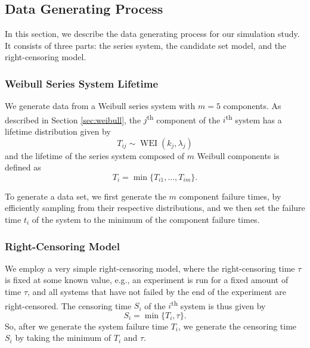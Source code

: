 \documentclass[
]{article}
\begin{document}
\hypertarget{data-generating-process}{%
\subsection{Data Generating Process}\label{data-generating-process}}

In this section, we describe the data generating process for our
simulation study. It consists of three parts: the series system, the
candidate set model, and the right-censoring model.

\hypertarget{weibull-series-system-lifetime}{%
\subsubsection*{Weibull Series System
Lifetime}\label{weibull-series-system-lifetime}}

We generate data from a Weibull series system with \(m=5\) components.
As described in Section \ref{sec:weibull}, the \(j\)\textsuperscript{th}
component of the \(i\)\textsuperscript{th} system has a lifetime
distribution given by \[
    T_{i j} \sim \operatorname{WEI}(k_j, \lambda_j)
\] and the lifetime of the series system composed of \(m\) Weibull
components is defined as \[
    T_i = \min\{T_{i 1}, \ldots, T_{i m}\}.
\]

To generate a data set, we first generate the \(m\) component failure
times, by efficiently sampling from their respective distributions, and
we then set the failure time \(t_i\) of the system to the minimum of the
component failure times.

\hypertarget{right-censoring-model}{%
\subsubsection*{Right-Censoring Model}\label{right-censoring-model}}

We employ a very simple right-censoring model, where the right-censoring
time \(\tau\) is fixed at some known value, e.g., an experiment is run
for a fixed amount of time \(\tau\), and all systems that have not
failed by the end of the experiment are right-censored. The censoring
time \(S_i\) of the \(i\)\textsuperscript{th} system is thus given by \[
    S_i = \min\{T_i, \tau\}.
\] So, after we generate the system failure time \(T_i\), we generate
the censoring time \(S_i\) by taking the minimum of \(T_i\) and
\(\tau\).
\end{document}
